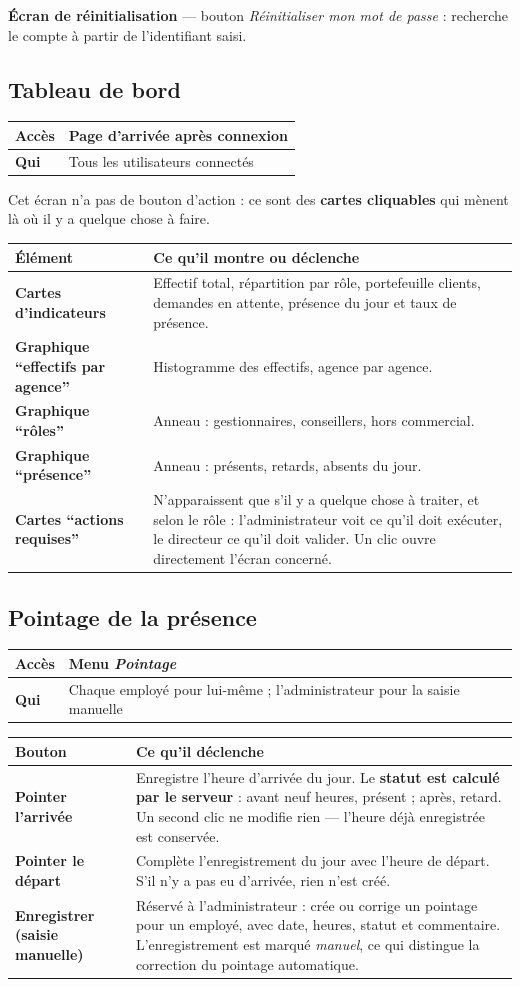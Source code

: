 \documentclass[a4paper,11pt]{article}
\newcommand{\ecran}[3]{%
  \subsection{#1}%
  \noindent\begin{tabularx}{\textwidth}{|>{\columncolor{btkpale}\bfseries}L{2.3cm}|X|}
  \hline
  \textbf{Accès} & #2\\
  \hline
  \textbf{Qui} & #3\\
  \hline
  \end{tabularx}\par\vspace{0.4em}}
\begin{document}
\vspace{0.4em}
\noindent\textbf{Écran de réinitialisation} --- bouton \emph{Réinitialiser mon
mot de passe} : recherche le compte à partir de l'identifiant saisi.

\ecran{Tableau de bord}{Page d'arrivée après connexion}{Tous les utilisateurs connectés}

Cet écran n'a pas de bouton d'action : ce sont des \textbf{cartes cliquables}
qui mènent là où il y a quelque chose à faire.

\noindent\begin{tabularx}{\textwidth}{|>{\bfseries}L{4.4cm}|X|}
\hline
\textmd{\textbf{Élément}} & \textbf{Ce qu'il montre ou déclenche}\\
\hline
Cartes d'indicateurs & Effectif total, répartition par rôle, portefeuille clients, demandes en attente, présence du jour et taux de présence.\\
\hline
Graphique \enquote{effectifs par agence} & Histogramme des effectifs, agence par agence.\\
\hline
Graphique \enquote{rôles} & Anneau : gestionnaires, conseillers, hors commercial.\\
\hline
Graphique \enquote{présence} & Anneau : présents, retards, absents du jour.\\
\hline
Cartes \enquote{actions requises} & N'apparaissent que s'il y a quelque chose à traiter, et selon le rôle : l'administrateur voit ce qu'il doit exécuter, le directeur ce qu'il doit valider. Un clic ouvre directement l'écran concerné.\\
\hline
\end{tabularx}

\ecran{Pointage de la présence}{Menu \emph{Pointage}}{Chaque employé pour lui-même ; l'administrateur pour la saisie manuelle}

\noindent\begin{tabularx}{\textwidth}{|>{\bfseries}L{4.4cm}|X|}
\hline
\textmd{\textbf{Bouton}} & \textbf{Ce qu'il déclenche}\\
\hline
Pointer l'arrivée & Enregistre l'heure d'arrivée du jour. Le \textbf{statut est calculé par le serveur} : avant neuf heures, présent ; après, retard. Un second clic ne modifie rien --- l'heure déjà enregistrée est conservée.\\
\hline
Pointer le départ & Complète l'enregistrement du jour avec l'heure de départ. S'il n'y a pas eu d'arrivée, rien n'est créé.\\
\hline
Enregistrer (saisie manuelle) & Réservé à l'administrateur : crée ou corrige un pointage pour un employé, avec date, heures, statut et commentaire. L'enregistrement est marqué \emph{manuel}, ce qui distingue la correction du pointage automatique.\\
\hline
\end{tabularx}
\end{document}
